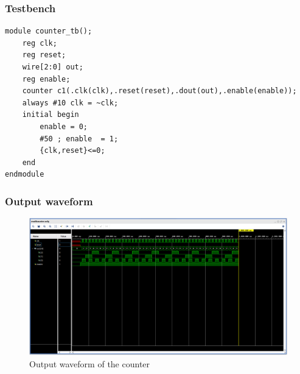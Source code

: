 \documentclass[titlepage]{article}
\begin{document}
\subsubsection{Testbench}
\begin{lstlisting}[style={verilog-style}]
    module counter_tb();
    reg clk;
    reg reset;
    wire[2:0] out;
    reg enable;  
    counter c1(.clk(clk),.reset(reset),.dout(out),.enable(enable));
    always #10 clk = ~clk;
    initial begin
        enable = 0;
        #50 ; enable  = 1;
        {clk,reset}<=0;
    end      
endmodule
\end{lstlisting}
\newpage
\subsubsection{Output waveform}
\begin{figure}[ht]
    \centering
    \includegraphics[scale = 0.4]{waveform.png}
    \caption{Output waveform of the counter}
\end{figure}
\end{document}
